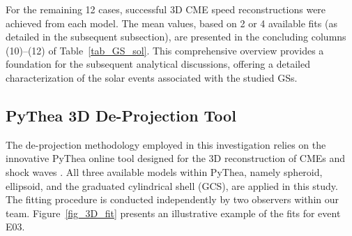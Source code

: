 For the remaining 12 cases, successful 3D CME speed reconstructions were achieved from each model. The mean values, based on 2 or 4 available fits (as detailed in the subsequent subsection), are presented in the concluding columns (10)–(12) of Table~\ref{tab_GS_sol}. This comprehensive overview provides a foundation for the subsequent analytical discussions, offering a detailed characterization of the solar events associated with the studied GSs.

\subsection{PyThea 3D De-Projection Tool}
The de-projection methodology employed in this investigation relies on the innovative PyThea online tool designed for the 3D reconstruction of CMEs and shock waves \citep{kouloumvakos_2022}. All three available models within PyThea, namely spheroid, ellipsoid, and the graduated cylindrical shell (GCS), are applied in this study. The fitting procedure is conducted independently by two observers within our team. Figure~\ref{fig_3D_fit} presents an illustrative example of the fits for event E03.

